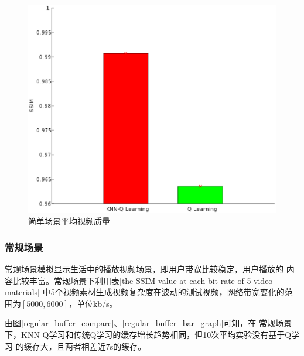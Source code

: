 \documentclass[twocolumn]{article}
\begin{document}
\begin{figure}[htbp]
\centering
\includegraphics[width=\columnwidth]{simple_ssim_bar_graph}
\caption{简单场景平均视频质量}
\label{simple_ssim_bar_graph}
\end{figure}

\subsubsection{常规场景}
常规场景模拟显示生活中的播放视频场景，即用户带宽比较稳定，用户播放的
内容比较丰富。常规场景下利用表\ref{the SSIM value at each bit rate of 5 video materials}
中5个视频素材生成视频复杂度在波动的测试视频，网络带宽变化的范围为$\left[5000,6000\right]$，单位kb/s。

由图\ref{regular_buffer_compare}、\ref{regular_buffer_bar_graph}可知，在
常规场景下，KNN-Q学习和传统Q学习的缓存增长趋势相同，但10次平均实验没有基于Q学习
的缓存大，且两者相差近7s的缓存。
\end{document}

